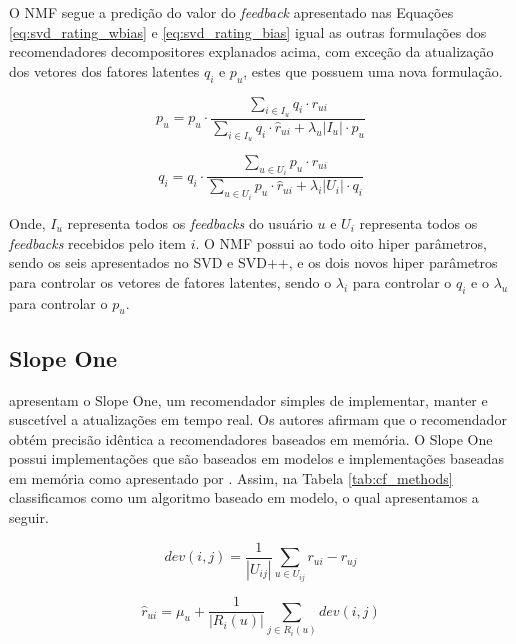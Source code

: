 O \ac{NMF} segue a predição do valor do \textit{feedback} apresentado nas Equações \ref{eq:svd_rating_wbias} e \ref{eq:svd_rating_bias} igual as outras formulações dos recomendadores decompositores explanados acima, com exceção da atualização dos vetores dos fatores latentes $q_i$ e $p_u$, estes que possuem uma nova formulação.

\begin{equation}
    \label{eq:nmf_pu}
    p_u = p_u \cdot \frac{\sum_{i \in I_u}q_i \cdot r_{ui}}{\sum_{i \in I_u}q_i \cdot \hat{r}_{ui} + \lambda_u |I_u| \cdot p_u}
\end{equation}

\begin{equation}
    \label{eq:nmf_qi}
    q_i = q_i \cdot \frac{\sum_{u \in U_i}p_u \cdot r_{ui}}{\sum_{u \in U_i}p_u \cdot \hat{r}_{ui} + \lambda_i |U_i| \cdot q_i}
\end{equation}

Onde, $I_u$ representa todos os \textit{feedbacks} do usuário $u$ e $U_i$ representa todos os \textit{feedbacks} recebidos pelo item $i$. O \ac{NMF} possui ao todo oito hiper parâmetros, sendo os seis apresentados no \ac{SVD} e \ac{SVD++}, e os dois novos hiper parâmetros para controlar os vetores de fatores latentes, sendo o $\lambda_i$ para controlar o $q_i$ e o $\lambda_u$ para controlar o $p_u$.

\subsection{Slope One}
\label{sec:slope_algo}
 apresentam o Slope One, um recomendador simples de implementar, manter e suscetível a atualizações em tempo real. Os autores afirmam que o recomendador obtém precisão idêntica a recomendadores baseados em memória. O Slope One possui implementações que são baseados em modelos e implementações baseadas em memória como apresentado por . Assim, na Tabela \ref{tab:cf_methods} classificamos como um algoritmo baseado em modelo, o qual apresentamos a seguir.

\begin{equation}
    \label{eq:slope_one_dev}
    dev(i,j) = \frac{1}{|U_{ij}|}\sum_{u \in U_{ij}} r_{ui} - r_{uj}
\end{equation}

\begin{equation}
    \label{eq:slope_one}
    \hat{r}_{ui} = \mu_u + \frac{1}{|R_{i}(u)|} \sum_{j \in R_{i}(u)} dev(i,j)
\end{equation}

